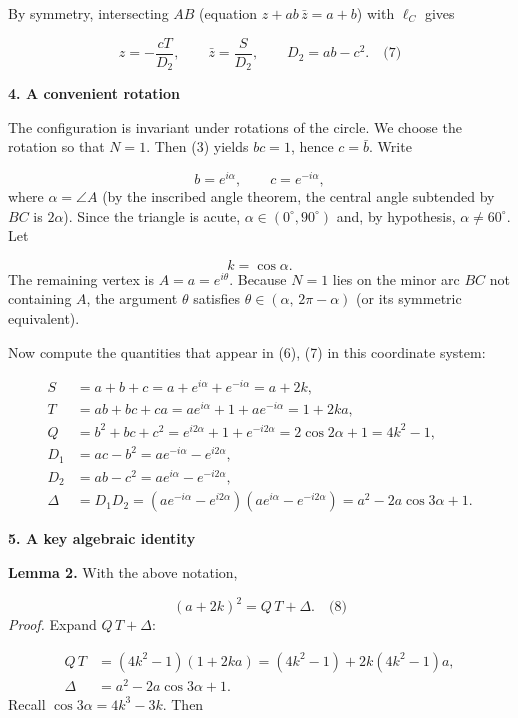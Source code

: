 \documentclass{llmxive}
\providecommand{\solutionheading}[1]{\par\smallskip\noindent\textbf{#1}\par}
\begin{document}
By symmetry, intersecting \(AB\) (equation \(z + ab\,\bar{z} = a+b\)) with \(\ell_C\) gives\par
\[
z = -\frac{c T}{D_2},\qquad \bar{z} = \frac{S}{D_2},\qquad D_2 = ab - c^2. \quad\text{(7)}
\]
\smallskip
\solutionheading{4. A convenient rotation}
The configuration is invariant under rotations of the circle. We choose the rotation so that \(N = 1\). Then (3) yields \(bc = 1\), hence \(c = \bar{b}\). Write\par
\[
b = e^{i\alpha},\qquad c = e^{-i\alpha},
\]
where \(\alpha = \angle A\) (by the inscribed angle theorem, the central angle subtended by \(BC\) is \(2\alpha\)). Since the triangle is acute, \(\alpha \in (0^\circ,90^\circ)\) and, by hypothesis, \(\alpha \neq 60^\circ\). Let\par
\[
k = \cos\alpha.
\]
The remaining vertex is \(A = a = e^{i\theta}\). Because \(N = 1\) lies on the minor arc \(BC\) not containing \(A\), the argument \(\theta\) satisfies \(\theta \in (\alpha,\, 2\pi-\alpha)\) (or its symmetric equivalent).\par
Now compute the quantities that appear in (6), (7) in this coordinate system:\par
\[
\begin{aligned}
S &= a + b + c = a + e^{i\alpha} + e^{-i\alpha} = a + 2k, \\[2mm]
T &= ab + bc + ca = a e^{i\alpha} + 1 + a e^{-i\alpha} = 1 + 2k a, \\[2mm]
Q &= b^2 + bc + c^2 = e^{i2\alpha} + 1 + e^{-i2\alpha} = 2\cos 2\alpha + 1 = 4k^2 - 1, \\[2mm]
D_1 &= ac - b^2 = a e^{-i\alpha} - e^{i2\alpha}, \\[2mm]
D_2 &= ab - c^2 = a e^{i\alpha} - e^{-i2\alpha}, \\[2mm]
\Delta &= D_1 D_2 = (a e^{-i\alpha} - e^{i2\alpha})(a e^{i\alpha} - e^{-i2\alpha}) = a^2 - 2a\cos 3\alpha + 1.
\end{aligned}
\]
\smallskip
\solutionheading{5. A key algebraic identity}
\textbf{Lemma 2.} With the above notation,\par
\[
(a + 2k)^2 = Q\,T + \Delta. \quad\text{(8)}
\]
\emph{Proof.} Expand \(Q\,T + \Delta\):\par
\[
\begin{aligned}
Q\,T &= (4k^2-1)(1+2k a) = (4k^2-1) + 2k(4k^2-1)a, \\[2mm]
\Delta &= a^2 - 2a\cos 3\alpha + 1.
\end{aligned}
\]
Recall \(\cos 3\alpha = 4k^3 - 3k\). Then\par
\end{document}
